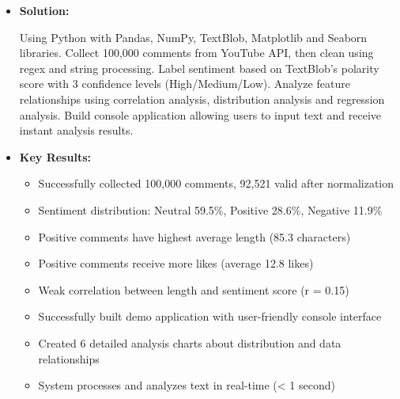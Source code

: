 \begin{itemize}
    \item[-] \textbf{Solution:}
    
    Using Python with Pandas, NumPy, TextBlob, Matplotlib and Seaborn libraries. Collect 100,000 comments from YouTube API, then clean using regex and string processing. Label sentiment based on TextBlob's polarity score with 3 confidence levels (High/Medium/Low). Analyze feature relationships using correlation analysis, distribution analysis and regression analysis. Build console application allowing users to input text and receive instant analysis results.
    
    \item[-] \textbf{Key Results:}
        \begin{itemize}
        \item[•] Successfully collected 100,000 comments, 92,521 valid after normalization
        \item[•] Sentiment distribution: Neutral 59.5\%, Positive 28.6\%, Negative 11.9\%
        \item[•] Positive comments have highest average length (85.3 characters)
        \item[•] Positive comments receive more likes (average 12.8 likes)
        \item[•] Weak correlation between length and sentiment score (r = 0.15)
        \item[•] Successfully built demo application with user-friendly console interface
        \item[•] Created 6 detailed analysis charts about distribution and data relationships
        \item[•] System processes and analyzes text in real-time (< 1 second)
        \end{itemize}
\end{itemize}

\newpage
